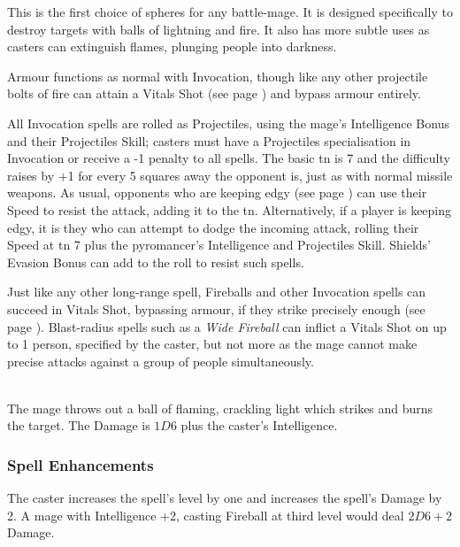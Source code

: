 \begin{multicols}{2}

\noindent
This is the first choice of spheres for any battle-mage.
It is designed specifically to destroy targets with balls of lightning and fire.
It also has more subtle uses as casters can extinguish flames, plunging people into darkness.

Armour functions as normal with Invocation, though like any other projectile bolts of fire can attain a Vitals Shot (see page \pageref{vitals}) and bypass armour entirely.

All Invocation spells are rolled as Projectiles, using the mage's Intelligence Bonus and their Projectiles Skill; casters must have a Projectiles specialisation in Invocation or receive a -1 penalty to all spells.
The basic \gls{tn} is 7 and the difficulty raises by +1 for every 5 squares away the opponent is, just as with normal missile weapons.
As usual, opponents who are keeping edgy (see page \pageref{edgy}) can use their Speed to resist the attack, adding it to the \gls{tn}.
Alternatively, if a player is keeping edgy, it is they who can attempt to dodge the incoming attack, rolling their Speed at \gls{tn} 7 plus the pyromancer's Intelligence and Projectiles Skill.
Shields' Evasion Bonus can add to the roll to resist such spells.

Just like any other long-range spell, Fireballs and other Invocation spells can succeed in Vitals Shot, bypassing armour, if they strike precisely enough (see page \pageref{vitals}).
Blast-radius spells such as a \textit{Wide Fireball} can inflict a Vitals Shot on up to 1 person, specified by the caster, but not more as the mage cannot make precise attacks against a group of people simultaneously.

\spelllevel

\\
The mage throws out a ball of flaming, crackling light which strikes and burns the target. The Damage is $1D6$ plus the caster's Intelligence.

\subsubsection{Spell Enhancements}

The caster increases the spell's level by one and increases the spell's Damage by 2.  A mage with Intelligence +2, casting Fireball at third level would deal $2D6+2$ Damage.


\end{multicols}
